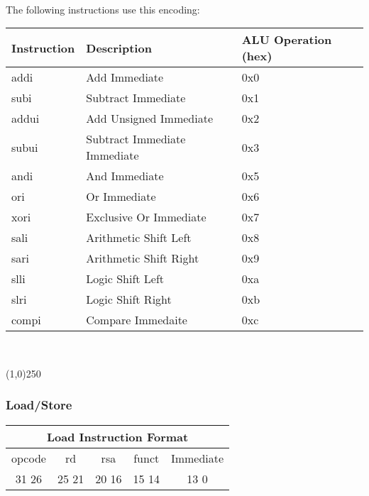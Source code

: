 \documentclass[letterpaper, 11pt]{article}
\begin{document}
\paragraph{}The following instructions use this encoding:
\begin{center}
	\begin{tabular}{|l|l|l|} \hline
			Instruction & Description 						& ALU Operation (hex) \\ \hline
			addi		& Add Immediate						& 0x0 \\ \hline
			subi 		& Subtract Immediate				& 0x1 \\ \hline
			addui 		& Add Unsigned Immediate			& 0x2 \\ \hline
			subui		& Subtract Immediate Immediate 	& 0x3 \\ \hline
			andi		& And Immediate						& 0x5 \\ \hline
			ori			& Or Immediate						& 0x6 \\ \hline
			xori		& Exclusive Or Immediate			& 0x7 \\ \hline
			sali		& Arithmetic Shift Left				& 0x8 \\ \hline
			sari		& Arithmetic Shift Right			& 0x9 \\ \hline
			slli		& Logic Shift Left 					& 0xa \\ \hline
			slri		& Logic Shift Right					& 0xb \\ \hline
			compi		& Compare Immedaite					& 0xc \\ \hline

	\end{tabular} \\
\end{center}
\begin{center}
	\line(1,0){250}
\end{center}

\subsubsection{Load/Store}
\begin{center}
		\begin{tabular}{|c|c|c|c|c|}
			\multicolumn{5}{c}{Load Instruction Format}\\ \hline
				\hspace{2pt} opcode \hspace{2pt} & \hspace{5pt} rd \hspace{5pt} &  \hspace{4pt} rsa \hspace{4pt} & \hspace{3pt} funct \hspace{3pt} & \hspace{10pt} Immediate \hspace{10pt}   \\	\hline
				31 \hfill 26& 25 \hfill 21 &20 \hfill  16& 15 \hfill 14  & 13 \hfill 0\\ \hline
		
	\end{tabular}
\end{center}
\end{document}
